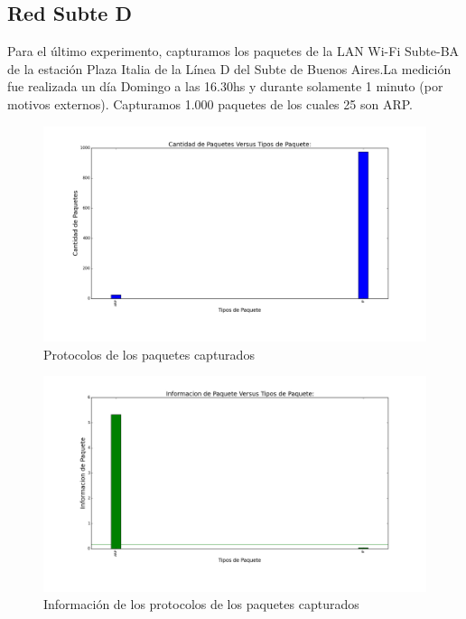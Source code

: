 \subsection{Red Subte D}

Para el último experimento, capturamos los paquetes de la LAN Wi-Fi Subte-BA de la estación Plaza Italia de la Línea D del Subte de Buenos Aires.La medición fue realizada un día Domingo a las 16.30hs y durante solamente 1 minuto (por motivos externos). Capturamos 1.000 paquetes de los cuales 25 son ARP.

\begin{figure}[H]
       \centering
       \includegraphics[width=1\textwidth]{../resultados/subte/histogram_types.png}
       \caption{Protocolos de los paquetes capturados}
       \label{red-Starbucks-types}
\end{figure}

\begin{figure}[H]
       \centering
       \includegraphics[width=1\textwidth]{../resultados/subte/histogram_types_information.png}
       \caption{Información de los protocolos de los paquetes capturados}
       \label{red-Starbucks-types-information}
\end{figure}

